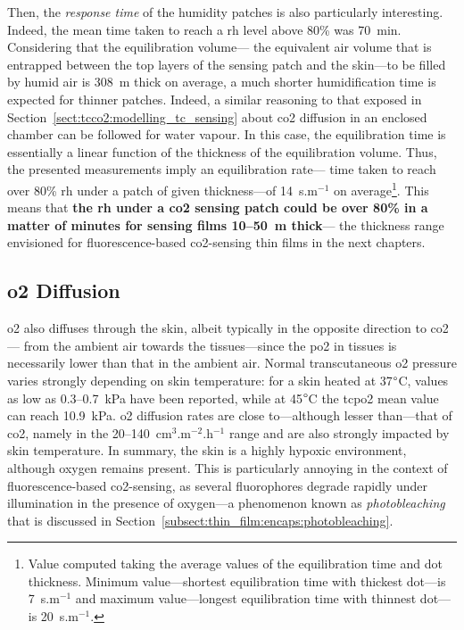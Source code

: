 Then, the \emph{response time} of the humidity patches is also particularly interesting. Indeed, the mean time taken to reach a \gls{rh} level above 80\% was 70~min. Considering that the equilibration volume---\ie{} the equivalent air volume that is entrapped between the top layers of the sensing patch and the skin---to be filled by humid air is 308~{\textmu}m thick on average, a much shorter humidification time is expected for thinner patches. Indeed, a similar reasoning to that exposed in Section~\ref{sect:tcco2:modelling_tc_sensing} about \gls{co2} diffusion in an enclosed chamber can be followed for water vapour. In this case, the equilibration time is essentially a linear function of the thickness of the equilibration volume. Thus, the presented measurements imply an equilibration rate---\ie{} time taken to reach over 80\% \gls{rh} under a patch of given thickness---of 14~s.{\textmu}m$^{-1}$ on average\footnote{Value computed taking the average values of the equilibration time and dot thickness. Minimum value---shortest equilibration time with thickest dot---is 7~s.{\textmu}m$^{-1}$ and maximum value---longest equilibration time with thinnest dot---is 20~s.{\textmu}m$^{-1}$.}. This means that \textbf{the \gls{rh} under a \gls{co2} sensing patch could be over 80\% in a matter of minutes for sensing films 10--50~{\textmu}m thick}---\ie{} the thickness range envisioned for fluorescence-based \gls{co2}-sensing thin films in the next chapters.

\subsection{\texorpdfstring{\Gls{o2}}{O2} Diffusion}\label{sect:tcco2:skin_mes:po2}

\gls{o2} also diffuses through the skin, albeit typically in the opposite direction to \gls{co2}---\ie{} from the ambient air towards the tissues---since the \gls{po2} in tissues is necessarily lower than that in the ambient air. Normal transcutaneous \gls{o2} pressure varies strongly depending on skin temperature: for a skin heated at 37$\degree$C, values as low as 0.3--0.7~kPa have been reported\cite{ewald1981}, while at 45$\degree$C the \gls{tcpo2} mean value can reach 10.9~kPa\cite{wimberley1985a}. \gls{o2} diffusion rates are close to---although lesser than---that of \gls{co2}, namely in the 20--140~cm$^3$.m$^{-2}$.h$^{-1}$ range\cite{shaw1929, ernstene1932b, fitzgerald1957, levshankov1983} and are also strongly impacted by skin temperature\cite{shaw1930}. In summary, the skin is a highly hypoxic environment, although oxygen remains present. This is particularly annoying in the context of fluorescence-based \gls{co2}-sensing, as several fluorophores degrade rapidly under illumination in the presence of oxygen---a phenomenon known as \emph{photobleaching} that is discussed in Section~\ref{subsect:thin_film:encaps:photobleaching}.

